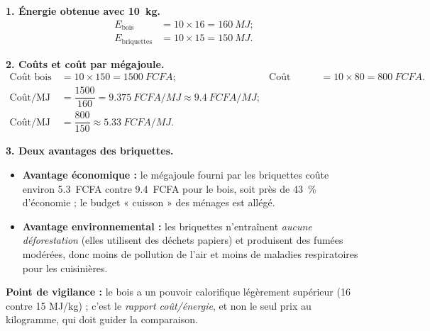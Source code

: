\documentclass[11pt]{article}
\begin{document}
\begin{corrige}
\textbf{1. Énergie obtenue avec \SI{10}{kg}.}
\begin{align*}
E_{\text{bois}} &= 10 \times 16 = \SI{160}{MJ} ;\\
E_{\text{briquettes}} &= 10 \times 15 = \SI{150}{MJ}.
\end{align*}

\textbf{2. Coûts et coût par mégajoule.}
\begin{align*}
\text{Coût bois} &= 10 \times 150 = \SI{1500}{FCFA} ; & \text{Coût briquettes} &= 10 \times 80 = \SI{800}{FCFA}.\\[2pt]
\text{Coût/MJ bois} &= \dfrac{1500}{160} = \SI{9,375}{FCFA/MJ} \approx \SI{9,4}{FCFA/MJ} ;\\
\text{Coût/MJ briquettes} &= \dfrac{800}{150} \approx \SI{5,33}{FCFA/MJ}.
\end{align*}

\textbf{3. Deux avantages des briquettes.}
\begin{itemize}
\item \textbf{Avantage économique :} le mégajoule fourni par les briquettes coûte environ \SI{5,3}{FCFA} contre \SI{9,4}{FCFA} pour le bois, soit près de \SI{43}{\percent} d'économie ; le budget « cuisson » des ménages est allégé.
\item \textbf{Avantage environnemental :} les briquettes n'entraînent \emph{aucune déforestation} (elles utilisent des déchets papiers) et produisent des fumées modérées, donc moins de pollution de l'air et moins de maladies respiratoires pour les cuisinières.
\end{itemize}

\textbf{Point de vigilance :} le bois a un pouvoir calorifique légèrement supérieur (16 contre 15 MJ/kg) ; c'est le \emph{rapport coût/énergie}, et non le seul prix au kilogramme, qui doit guider la comparaison.
\end{corrige}
\end{document}
